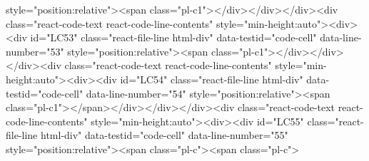 style="position:relative"><span class="pl-c1">\def\maxwidth</span>{<span class="pl-k">\ifdim</span><span class="pl-c1">\Gin@nat@width</span>&gt;<span class="pl-c1">\linewidth\linewidth</span><span class="pl-k">\else</span><span class="pl-c1">\Gin@nat@width</span><span class="pl-k">\fi</span>}</div></div></div><div class="react-code-text react-code-line-contents" style="min-height:auto"><div><div id="LC53" class="react-file-line html-div" data-testid="code-cell" data-line-number="53" style="position:relative"><span class="pl-c1">\def\maxheight</span>{<span class="pl-k">\ifdim</span><span class="pl-c1">\Gin@nat@height</span>&gt;<span class="pl-c1">\textheight\textheight</span><span class="pl-k">\else</span><span class="pl-c1">\Gin@nat@height</span><span class="pl-k">\fi</span>}</div></div></div><div class="react-code-text react-code-line-contents" style="min-height:auto"><div><div id="LC54" class="react-file-line html-div" data-testid="code-cell" data-line-number="54" style="position:relative"><span class="pl-c1">\makeatother</span></div></div></div><div class="react-code-text react-code-line-contents" style="min-height:auto"><div><div id="LC55" class="react-file-line html-div" data-testid="code-cell" data-line-number="55" style="position:relative"><span class="pl-c"><span class="pl-c">%